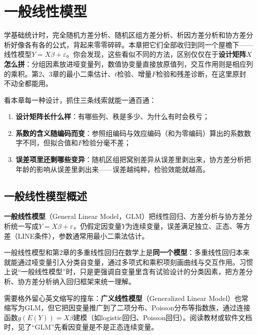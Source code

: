 \chapter{一般线性模型}
学基础统计时，完全随机方差分析、随机区组方差分析、析因方差分析和协方差分析好像各有各的公式，背起来零零碎碎。本章把它们全部收归到同一个屋檐下——线性模型$Y=X\beta+\varepsilon$。你会发现，这些看似不同的方法，区别仅仅在于\textbf{设计矩阵$X$怎么拼}：分组因素放进哑变量列，数值协变量直接放原值列，交互作用则是相应列的乘积。第2、3章的最小二乘估计、$t$检验、增量$F$检验和残差诊断，在这里原封不动全都能用。

看本章每一种设计，抓住三条线索就能一通百通：
\begin{enumerate}
\item \textbf{设计矩阵长什么样}：有哪些列、秩是多少、为什么有时会秩亏；
\item \textbf{系数的含义随编码而变}：参照组编码与效应编码（和为零编码）算出的系数数字不同，但拟合值和$F$检验分毫不差；
\item \textbf{误差项里还剩哪些变异}：随机区组把窝别差异从误差里剥出来，协方差分析把年龄的影响从误差里剥出来——误差越纯粹，检验效能就越高。
\end{enumerate}

\section{一般线性模型概述}
\textbf{一般线性模型}（General Linear Model，GLM）把线性回归、方差分析与协方差分析统一写成$Y=X\beta+\varepsilon$，仍假定因变量$Y$为连续变量，误差满足独立、正态、等方差（LINE条件），参数通常用最小二乘法估计。

一般线性模型和第2章的多重线性回归在数学上是\textbf{同一个模型}：多重线性回归本来就能通过哑变量引入分类自变量，通过多项式和乘积项刻画曲线与交互作用。习惯上说“一般线性模型”时，只是更强调自变量里含有试验设计的分类因素，把方差分析、协方差分析纳入回归框架来统一理解。

需要格外留心英文缩写的撞车：\textbf{广义线性模型}（Generalized Linear Model）也常缩写为GLM，但它把因变量推广到了二项分布、Poisson分布等指数族，通过连接函数$g(E(Y))=X\beta$建模（如logistic回归、Poisson回归）。阅读教材或软件文档时，见了“GLM”先看因变量是不是正态连续变量。

